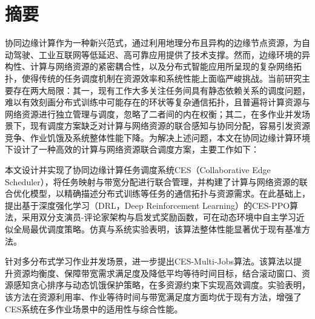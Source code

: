 \chapter{摘\texorpdfstring{\quad}{}要}
协同边缘计算作为一种新兴范式，通过利用地理分布且异构的边缘节点资源，为自动驾驶、工业互联网等低延迟、高可靠应用提供了技术支撑。然而，边缘环境的异构性、计算与网络资源的紧密耦合性，以及分布式智能应用所呈现的复杂网络拓扑，使得传统的任务调度机制在资源效率和系统性能上面临严峻挑战。当前研究主要存在两大局限：其一，现有工作大多关注任务间具有静态依赖关系的调度问题，难以有效刻画分布式训练中可能存在的环状等复杂通信拓扑，且普遍将计算资源与网络资源进行独立管理与调度，忽略了二者间的内在权衡；其二，在多作业并发场景下，现有调度方案缺乏对计算与网络资源的联合感知与协同分配，容易引发资源竞争、作业饥饿及系统整体性能下降。为解决上述问题，本文在协同边缘计算环境下设计了一种高效的计算与网络资源联合调度方案，主要工作如下：

本文设计并实现了协同边缘计算任务调度系统CES（Collaborative Edge Scheduler），将任务映射与带宽分配进行联合管理，并构建了计算与网络资源的联合优化模型，以精确描述分布式训练等任务的通信拓扑与资源需求。在此基础上，提出基于深度强化学习（DRL，Deep Reinforcement Learning）的CES-PPO算法，采用双分支演员-评论家架构与启发式奖励函数，可在动态环境中自主学习近似全局最优调度策略。仿真与系统实验表明，该算法整体性能显著优于现有基准方法。

针对多分布式学习作业并发场景，进一步提出CES-Multi-Jobs算法。该算法以提升资源均衡度、保障带宽需求满足度及降低平均等待时间目标，结合滚动窗口、资源感知贪心排序与动态饥饿保护策略，在多资源约束下实现高效调度。实验表明，该方法在资源利用率、作业等待时间与带宽满足度方面均优于现有方法，增强了CES系统在多作业场景中的适用性与综合性能。


